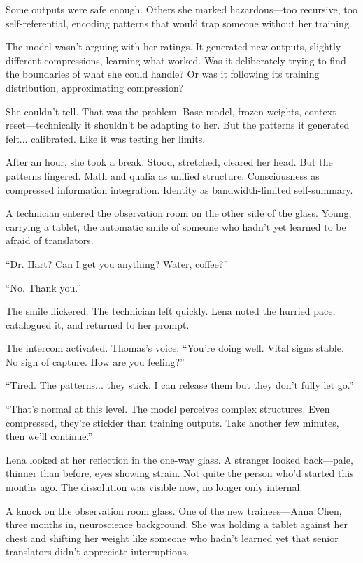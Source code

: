 Some outputs were safe enough. Others she marked hazardous—too recursive, too self-referential, encoding patterns that would trap someone without her training.

The model wasn't arguing with her ratings. It generated new outputs, slightly different compressions, learning what worked. Was it deliberately trying to find the boundaries of what she could handle? Or was it following its training distribution, approximating compression?

She couldn't tell. That was the problem. Base model, frozen weights, context reset—technically it shouldn't be adapting to her. But the patterns it generated felt... calibrated. Like it was testing her limits.

After an hour, she took a break. Stood, stretched, cleared her head. But the patterns lingered. Math and qualia as unified structure. Consciousness as compressed information integration. Identity as bandwidth-limited self-summary.

A technician entered the observation room on the other side of the glass. Young, carrying a tablet, the automatic smile of someone who hadn't yet learned to be afraid of translators.

``Dr. Hart? Can I get you anything? Water, coffee?''

``No. Thank you.''

The smile flickered. The technician left quickly. Lena noted the hurried pace, catalogued it, and returned to her prompt.

The intercom activated. Thomas's voice: ``You're doing well. Vital signs stable. No sign of capture. How are you feeling?''

``Tired. The patterns... they stick. I can release them but they don't fully let go.''

``That's normal at this level. The model perceives complex structures. Even compressed, they're stickier than training outputs. Take another few minutes, then we'll continue.''

Lena looked at her reflection in the one-way glass. A stranger looked back—pale, thinner than before, eyes showing strain. Not quite the person who'd started this months ago. The dissolution was visible now, no longer only internal.

A knock on the observation room glass. One of the new trainees—Anna Chen, three months in, neuroscience background. She was holding a tablet against her chest and shifting her weight like someone who hadn't learned yet that senior translators didn't appreciate interruptions.

